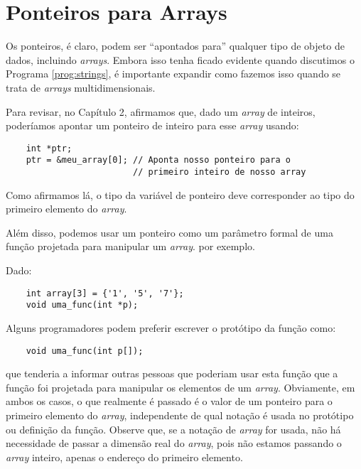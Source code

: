 
\chapter{Ponteiros para Arrays}
Os ponteiros, é claro, podem ser ``apontados para'' qualquer tipo de objeto de dados, incluindo \textit{arrays}. Embora isso tenha ficado evidente quando discutimos o Programa \ref{prog:strings}, é importante expandir como fazemos isso quando se trata de \textit{arrays} multidimensionais.

Para revisar, no Capítulo 2, afirmamos que, dado um \textit{array} de inteiros, poderíamos apontar um ponteiro de inteiro para esse \textit{array} usando:
\begin{lstlisting}
	int *ptr;
	ptr = &meu_array[0]; // Aponta nosso ponteiro para o 
	                     // primeiro inteiro de nosso array
\end{lstlisting}

Como afirmamos lá, o tipo da variável de ponteiro deve corresponder ao tipo do primeiro elemento do \textit{array}.

Além disso, podemos usar um ponteiro como um parâmetro formal de uma função projetada para manipular um \textit{array}. por exemplo.

Dado:
\begin{lstlisting}
	int array[3] = {'1', '5', '7'};
	void uma_func(int *p);
\end{lstlisting}

Alguns programadores podem preferir escrever o protótipo da função como:
\begin{lstlisting}
	void uma_func(int p[]);
\end{lstlisting}
que tenderia a informar outras pessoas que poderiam usar esta função que a função foi projetada para manipular os elementos de um \textit{array}. Obviamente, em ambos os casos, o que realmente é passado é o valor de um ponteiro para o primeiro elemento do \textit{array}, independente de qual notação é usada no protótipo ou definição da função. Observe que, se a notação de \textit{array} for usada, não há necessidade de passar a dimensão real do \textit{array}, pois não estamos passando o \textit{array} inteiro, apenas o endereço do primeiro elemento.

